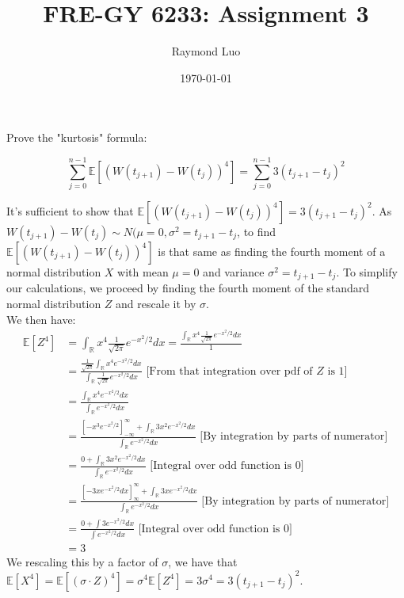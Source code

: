 \documentclass[12pt,twoside, letter]{exam}
\theoremstyle{definition}
\newcommand{\rr}{\mathbb{R}}
\newcommand{\ee}{\mathbb{E}}
\begin{document}
\abovedisplayskip=12pt
\belowdisplayskip=12pt
\abovedisplayshortskip=7pt
\belowdisplayshortskip=10pt
\allowdisplaybreaks

\setlength{\parindent}{18pt}

\title{FRE-GY 6233: Assignment 3}
\author{Raymond Luo}
\date{\today}
\maketitle

 Prove the "kurtosis" formula:

\begin{equation*}
  \sum^{n-1}_{j=0} \ee[(W(t_{j+1}) - W(t_{j}))^{4}] = \sum^{n-1}_{j=0} 3(t_{j+1} - t_{j})^2
\end{equation*}

\begin{solution}
  It's sufficient to show that $\ee[(W(t_{j+1}) - W(t_{j}))^{4}] = 3(t_{j+1} - t_{j})^2$. As $W(t_{j+1}) - W(t_{j}) \sim N(\mu = 0, \sigma^{2} = t_{j+1}-t_{j}$,
  to find $\ee[(W(t_{j+1}) - W(t_{j}))^{4}]$ is that same as finding the fourth moment of a normal distribution $X$ with mean $\mu = 0$ and variance $\sigma^{2} = t_{j+1}-t_{j}$.
  To simplify our calculations, we proceed by finding the fourth moment of the standard normal distribution $Z$ and rescale it by $\sigma$. \\
  We then have: \\
  \begin{align*}
    \ee[Z^{4}] &= \int_{\rr} x^4\frac{1}{\sqrt{2\pi}}e^{-x^2/2}dx = \frac{\int_{\rr} x^4\frac{1}{\sqrt{2\pi}}e^{-x^2/2}dx}{1} \\
    &= \frac{\frac{1}{\sqrt{2\pi}} \int_{\rr} x^4 e^{-x^2/2}dx}{\int_{\rr}\frac{1}{\sqrt{2\pi}}e^{-x^2/2} dx} \text{ [From that integration over pdf of $Z$ is 1]} \\
    &= \frac{\int_{\rr} x^4 e^{-x^2/2}dx}{\int_{\rr} e^{-x^2/2}dx} \\
    &= \frac{[-x^{3}e^{-x^2/2}]^{\infty}_{-\infty} + \int_{\rr} 3x^2e^{-x^2/2}dx}{\int_{\rr} e^{-x^2/2}dx} \text{ [By integration by parts of numerator]} \\
    &= \frac{0 + \int_{\rr} 3x^2e^{-x^2/2}dx}{\int_{\rr} e^{-x^2/2}dx} \text{ [Integral over odd function is 0]} \\
    &= \frac{[-3xe^{-x^2/2}dx]^{\infty}_{\infty} + \int_{\rr}3xe^{-x^2/2}dx}{\int_{\rr} e^{-x^2/2}dx} \text{ [By integration by parts of numerator]} \\
    &= \frac{0 + \int 3e^{-x^2/2}dx}{\int e^{-x^2/2}dx} \text{ [Integral over odd function is 0]}\\
    &= 3
  \end{align*}
  We rescaling this by a factor of $\sigma$, we have that $\ee[X^{4}] = \ee[(\sigma\cdot Z)^{4}] = \sigma^{4} \ee[Z^{4}] = 3\sigma^{4} = 3(t_{j+1}-t_{j})^{2}$.
\end{solution}
\end{document}
